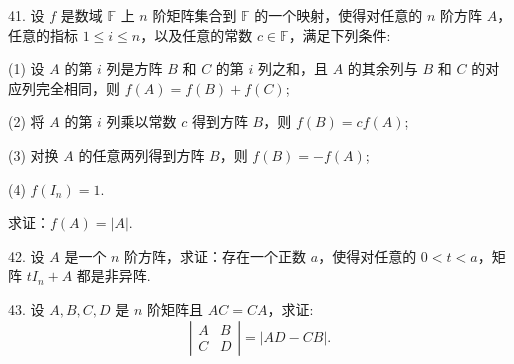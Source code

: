 \documentclass[UTF8, 12pt, fontset=fandol, oneside]{ctexart}
\begin{document}
41. 设 $f$ 是数域 $\mathbb{F}$ 上 $n$ 阶矩阵集合到 $\mathbb{F}$ 的一个映射，使得对任意的 $n$ 阶方阵 $A$，任意的指标 $1\leq i\leq n$，以及任意的常数 $c\in\mathbb{F}$，满足下列条件:

(1) 设 $A$ 的第 $i$ 列是方阵 $B$ 和 $C$ 的第 $i$ 列之和，且 $A$ 的其余列与 $B$ 和 $C$ 的对应列完全相同，则 $f(A)=f(B)+f(C)$;

(2) 将 $A$ 的第 $i$ 列乘以常数 $c$ 得到方阵 $B$，则 $f(B)=cf(A)$;

(3) 对换 $A$ 的任意两列得到方阵 $B$，则 $f(B)=-f(A)$;

(4) $f(I_n)=1$.

求证：$f(A)=|A|$.

42. 设 $A$ 是一个 $n$ 阶方阵，求证：存在一个正数 $a$，使得对任意的 $0<t<a$，矩阵 $tI_n+A$ 都是非异阵.

43. 设 $A,B,C,D$ 是 $n$ 阶矩阵且 $AC=CA$，求证:
\[
\left|\begin{array}{cc}
A & B\\
C & D
\end{array}\right|=|AD-CB|.
\]
\end{document}
